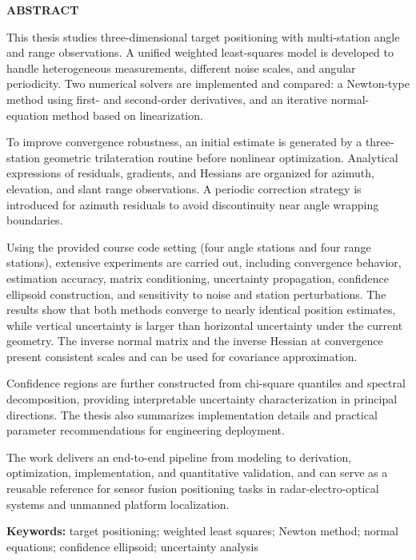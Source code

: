 \thispagestyle{plain}
{}
\centerline{\bfseries ABSTRACT}

\linespread{1.4}\bigskip

This thesis studies three-dimensional target positioning with multi-station angle and range observations. A unified weighted least-squares model is developed to handle heterogeneous measurements, different noise scales, and angular periodicity. Two numerical solvers are implemented and compared: a Newton-type method using first- and second-order derivatives, and an iterative normal-equation method based on linearization.

To improve convergence robustness, an initial estimate is generated by a three-station geometric trilateration routine before nonlinear optimization. Analytical expressions of residuals, gradients, and Hessians are organized for azimuth, elevation, and slant range observations. A periodic correction strategy is introduced for azimuth residuals to avoid discontinuity near angle wrapping boundaries.

Using the provided course code setting (four angle stations and four range stations), extensive experiments are carried out, including convergence behavior, estimation accuracy, matrix conditioning, uncertainty propagation, confidence ellipsoid construction, and sensitivity to noise and station perturbations. The results show that both methods converge to nearly identical position estimates, while vertical uncertainty is larger than horizontal uncertainty under the current geometry. The inverse normal matrix and the inverse Hessian at convergence present consistent scales and can be used for covariance approximation.

Confidence regions are further constructed from chi-square quantiles and spectral decomposition, providing interpretable uncertainty characterization in principal directions. The thesis also summarizes implementation details and practical parameter recommendations for engineering deployment.

The work delivers an end-to-end pipeline from modeling to derivation, optimization, implementation, and quantitative validation, and can serve as a reusable reference for sensor fusion positioning tasks in radar-electro-optical systems and unmanned platform localization.

\bigskip
\noindent\textbf{ Keywords:}
target positioning; weighted least squares; Newton method; normal equations; confidence ellipsoid; uncertainty analysis
